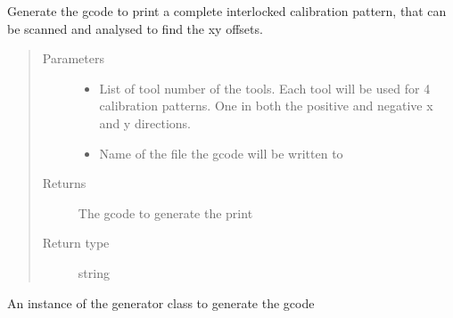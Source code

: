 \documentclass[letterpaper,10pt,english]{sphinxmanual}
\begin{document}
\begin{fulllineitems}
\begin{fulllineitems}
\label{\detokenize{index:calibration_pattern.calibration_pattern.full_interlocked_print}}
\sphinxAtStartPar
Generate the gcode to print a complete interlocked calibration pattern, that can be scanned and analysed to find the xy offsets.
\begin{quote}\begin{description}
\item[{Parameters}] \leavevmode\begin{itemize}
\item {} 
\sphinxAtStartPar
{} \textendash{} List of tool number of the tools. Each tool will be used for 4 calibration patterns. One in both the positive and negative x and y directions.

\item {} 
\sphinxAtStartPar
{} \textendash{} Name of the file the gcode will be written to

\end{itemize}

\item[{Returns}] \leavevmode
\sphinxAtStartPar
The gcode to generate the print

\item[{Return type}] \leavevmode
\sphinxAtStartPar
string

\end{description}\end{quote}

\end{fulllineitems}


\begin{fulllineitems}
\label{\detokenize{index:calibration_pattern.calibration_pattern.gen}}
\sphinxAtStartPar
An instance of the generator class to generate the gcode

\end{fulllineitems}


\end{fulllineitems}
\end{document}
